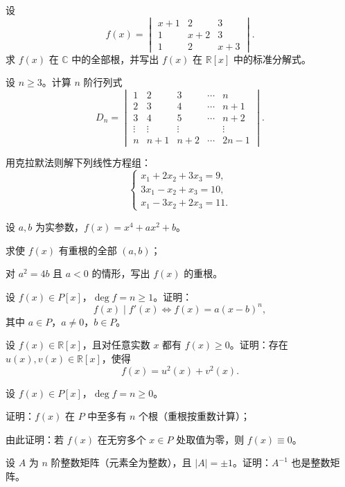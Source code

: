 \documentclass[11pt,a4paper,fontset=windows]{ctexart}
\begin{document}
\begin{qs}
\item 设
\[
f(x)=\begin{vmatrix}
x+1&2&3\\
1&x+2&3\\
1&2&x+3
\end{vmatrix}.
\]
求 $f(x)$ 在 $\mathbb{C}$ 中的全部根，并写出 $f(x)$ 在 $\mathbb{R}[x]$ 中的标准分解式。

\item 设 $n\ge 3$。计算 $n$ 阶行列式
\[
D_n=\begin{vmatrix}
1&2&3&\cdots&n\\
2&3&4&\cdots&n+1\\
3&4&5&\cdots&n+2\\
\vdots&\vdots&\vdots&&\vdots\\
n&n+1&n+2&\cdots&2n-1
\end{vmatrix}.
\]

\item 用克拉默法则解下列线性方程组：
\[
\begin{cases}
x_1+2x_2+3x_3=9,\\[2pt]
3x_1-x_2+x_3=10,\\[2pt]
x_1-3x_2+2x_3=11.
\end{cases}
\]

\item 设 $a,b$ 为实参数，$f(x)=x^{4}+ax^{2}+b$。
\begin{sub}
\item 求使 $f(x)$ 有重根的全部 $(a,b)$；
\item 对 $a^{2}=4b$ 且 $a<0$ 的情形，写出 $f(x)$ 的重根。
\end{sub}
\end{qs}

\begin{qs}[resume*]
\item 设 $f(x)\in P[x]$，$\deg f=n\ge 1$。证明：
\[
f(x)\mid f'(x)\iff f(x)=a(x-b)^{n},
\]
其中 $a\in P$，$a\neq 0$，$b\in P$。

\item 设 $f(x)\in\mathbb{R}[x]$，且对任意实数 $x$ 都有 $f(x)\ge 0$。证明：存在
$u(x),v(x)\in\mathbb{R}[x]$，使得
\[
f(x)=u^{2}(x)+v^{2}(x).
\]

\item 设 $f(x)\in P[x]$，$\deg f=n\ge 0$。
\begin{sub}
\item 证明：$f(x)$ 在 $P$ 中至多有 $n$ 个根（重根按重数计算）；
\item 由此证明：若 $f(x)$ 在无穷多个 $x\in P$ 处取值为零，则 $f(x)\equiv 0$。
\end{sub}

\item 设 $A$ 为 $n$ 阶整数矩阵（元素全为整数），且 $|A|=\pm 1$。证明：$A^{-1}$ 也是整数矩阵。
\end{qs}
\end{document}
